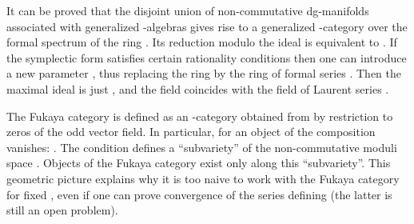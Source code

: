 \documentclass[a4paper,12pt]{article}
\begin{document}
It can be proved that the disjoint union of non-commutative dg-manifolds
associated with generalized \myHighlight{$\A$}\coordHE{}-algebras \coordHE{} gives rise
to a generalized \myHighlight{$\A$}\coordHE{}-category \coordHE{} over the 
formal spectrum of the ring
\coordHE{}. Its reduction modulo the ideal
\coordHE{} is equivalent to \coordHE{}.
If the symplectic form \myHighlight{$\omega$}\coordHE{} satisfies certain rationality
conditions then one can introduce a new
parameter \coordHE{},
thus replacing the ring \coordHE{} by the ring of formal series
\myHighlight{$\C[[q]]$}\coordHE{}. Then the maximal ideal is just \coordHE{}, and the  field
\myHighlight{$\C_{\epsilon}$}\coordHE{} coincides with the field of Laurent series \coordHE{}.

The Fukaya category \coordHE{} is defined as an \myHighlight{$\A$}\coordHE{}-category obtained
from \coordHE{} by restriction to zeros of the odd vector field.
In particular, for an object \coordHE{} of \coordHE{} the composition \coordHE{} vanishes:
\coordHE{}. The condition \coordHE{} defines a 
``subvariety'' of the non-commutative
moduli space \coordHE{}. Objects of the Fukaya
category exist only along this ``subvariety''. This geometric picture
explains why
it is too naive to work with the Fukaya category for fixed \myHighlight{$\epsilon$}\coordHE{},
even if one can prove convergence of the series defining \coordHE{}
(the latter is still an open problem).
\end{document}
